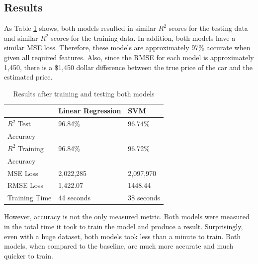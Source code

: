 \documentclass[compsoc]{IEEEtran}
\begin{document}
\subsection{Results}
As Table \ref{table:results} shows, both models resulted in similar $R^2$ scores for the testing data and similar $R^2$ scores for the training data. In addition, both models have a similar MSE loss. Therefore, these models are approximately 97\% accurate when given all required features. Also, since the RMSE for each model is approximately 1,450, there is a \$1,450 dollar difference between the true price of the car and the estimated price.

\begin{table}[h]
\centering
\caption{Results after training and testing both models}
\begin{tabular}{|l|l|l|}
\hline
                     & Linear Regression & SVM \\ \hline
$R^2$ Test       & 96.84\%           & 96.74\%        \\
Accuracy           & & \\ \hline
$R^2$ Training       & 96.84\%           & 96.72\%        \\
Accuracy       & & \\ \hline
MSE Loss             & 2,022,285         & 2,097,970      \\ \hline
RMSE Loss            & 1,422.07         & 1448.44      \\ \hline
Training Time        & 44 seconds      & 38 seconds  \\ \hline
\end{tabular}
\label{table:results}
\end{table}

However, accuracy is not the only measured metric. Both models were measured in the total time it took to train the model and produce a result. Surprisingly, even with a huge dataset, both models took less than a minute to train. Both models, when compared to the baseline, are much more accurate and much quicker to train.
\end{document}
